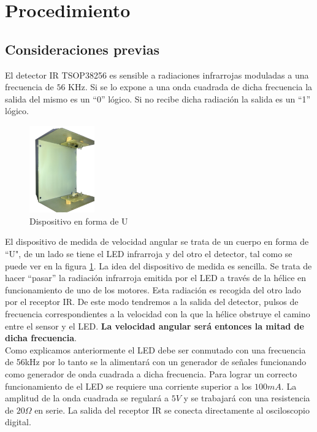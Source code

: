 \documentclass[main]{subfiles}
\begin{document}
\section{Procedimiento}


\subsection{Consideraciones previas}

El detector IR TSOP38256 es sensible a radiaciones infrarrojas moduladas a una frecuencia de $56$ KHz. Si se lo expone a una onda cuadrada de dicha frecuencia la salida del mismo es un ``0'' l\'ogico. Si no recibe dicha radiaci\'on la salida es un ``1'' l\'ogico.\\
\begin{figure}
  \begin{center}
    \includegraphics[width=0.25\textwidth]{./pics_motores/u.jpg}
  \end{center}
  \caption{Dispositivo en forma de U}
  \label{fig:u}
\end{figure}
El dispositivo de medida de velocidad angular se trata de un cuerpo en forma de ``U", de un lado se tiene el LED infrarroja y del otro el detector, tal como se puede ver en la figura \ref{fig:u}.
La idea del dispositivo de medida es sencilla. Se trata de hacer ``pasar'' la radiaci\'on infrarroja emitida por el LED a trav\'es de la h\'elice en funcionamiento de uno de los motores. Esta radiaci\'on es recogida del otro lado por el receptor IR. De este modo tendremos a la salida del detector, pulsos de frecuencia correspondientes a la velocidad con la que la h\'elice obstruye el camino entre el sensor y el LED. \textbf{La velocidad angular ser\'a entonces la mitad de dicha frecuencia}.\\

Como explicamos anteriormente el LED debe ser conmutado con una frecuencia de 56kHz por lo tanto se la alimentar\'a con un generador de se\~nales funcionando como generador de onda cuadrada a dicha frecuencia. Para lograr un correcto funcionamiento de el LED se requiere una corriente superior a los $100mA$. La amplitud de la onda cuadrada se regular\'a a $5V$ y se trabajar\'a con una resistencia de $20\Omega$ en serie. La salida del receptor IR se conecta directamente al osciloscopio digital.\\
\end{document}
